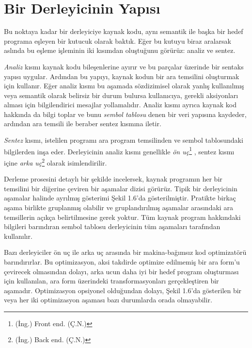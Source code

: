 \section{Bir Derleyicinin Yapısı}

Bu noktaya kadar bir derleyiciye kaynak kodu, aynı semantik ile başka bir hedef programa eşleyen bir kutucuk olarak baktık. Eğer bu kutuyu biraz aralarsak aslında bu eşleme işleminin iki kısımdan oluştuğunu görürüz: analiz ve sentez.

\textit{Analiz} kısmı kaynak kodu bileşenlerine ayırır ve bu parçalar üzerinde bir sentaks yapısı uygular. Ardından bu yapıyı, kaynak kodun bir ara temsilini oluşturmak için kullanır. Eğer analiz kısmı bu aşamada sözdizimisel olarak yanlış kullanılmış veya semantik olarak belirsiz bir durum bulursa kullanıcıya, gerekli aksiyonları alması için bilgilendirici mesajlar yollamalıdır. Analiz kısmı ayrıca kaynak kod hakkında da bilgi toplar ve bunu \textit{sembol tablosu} denen bir veri yapısına kaydeder, ardından ara temsili ile beraber sentez kısmına iletir.

\setcounter{footnote}{0}
\textit{Sentez} kısmı, istelilen programı ara program temsilinden ve sembol tablosundaki bilgilerden inşa eder. Derleyicinin analiz kısmı genellikle \textit{ön uç}\footnote{(İng.) Front end. (Ç.N.)} , sentez kısmı içine \textit{arka uç}\footnote{(İng.) Back end. (Ç.N.)}  olarak isimlendirilir.

Derleme prosesini detaylı bir şekilde incelersek, kaynak programın her bir temsilini bir diğerine çeviren bir aşamalar dizisi görürüz. Tipik bir derleyicinin aşamalar halinde ayrılmış gösterimi Şekil 1.6'da gösterilmiştir. Pratikte birkaç aşama birlikte gruplanmış olabilir ve gruplandırılmış aşamalar arasındaki ara temsillerin açıkça belirtilmesine gerek yoktur. Tüm kaynak program hakkındaki bilgileri barındıran sembol tablosu derleyicinin tüm aşamaları tarafından kullanılır.



Bazı derleyiciler ön uç ile arka uç arasında bir makina-bağımsız kod optimizatörü barındırırlar. Bu optimizasyon, aksi takdirde optimize edilmemiş bir ara form'u çevirecek olmasından dolayı, arka ucun daha iyi bir hedef program oluşturması için kullanılan, ara form üzerindeki transformasyonları gerçekleştiren bir aşamadır. Optimizasyon opsiyonel olduğundan dolayı, Şekil 1.6'da gösterilen bir veya her iki optimizasyon aşaması bazı durumlarda orada olmayabilir.

